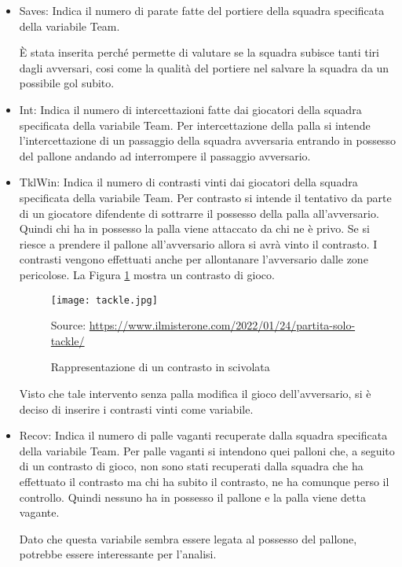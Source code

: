 \begin{itemize}
	
	\item \textsf{Saves}: Indica il numero di parate fatte del portiere della squadra specificata della variabile \textsf{Team}. 
	
	È stata inserita perché permette di valutare se la squadra subisce tanti tiri dagli avversari, cosi come la qualità del portiere nel salvare la squadra da un possibile gol subito.
	
	\item \textsf{Int}: Indica il numero di intercettazioni fatte dai giocatori della squadra specificata della variabile \textsf{Team}. Per intercettazione della palla si intende l'intercettazione di un passaggio della squadra avversaria entrando in possesso del pallone andando ad interrompere il passaggio avversario. 

	\item \textsf{TklWin}: Indica il numero di contrasti vinti dai giocatori della squadra specificata della variabile \textsf{Team}. Per contrasto si intende il tentativo da parte di un giocatore difendente di sottrarre il possesso della palla all'avversario. Quindi chi ha in possesso la palla viene attaccato da chi ne è privo. Se si riesce a prendere il pallone all'avversario allora si avrà vinto il contrasto. I contrasti vengono effettuati anche per allontanare l'avversario dalle zone pericolose. La Figura \ref{fig:tackle} mostra un contrasto di gioco.
	
	\begin{figure}[!ht]
		\begin{center}
			\texttt{[image: tackle.jpg]}
			\caption{Rappresentazione di un contrasto in scivolata}
			Source: \url{https://www.ilmisterone.com/2022/01/24/partita-solo-tackle/}
		 \label{fig:tackle}
		\end{center}
	\end{figure}
	
	Visto che tale intervento senza palla modifica il gioco dell'avversario, si è deciso di inserire i contrasti vinti come variabile. 
	
	\item \textsf{Recov}: Indica il numero di palle vaganti recuperate dalla squadra specificata della variabile \textsf{Team}. Per palle vaganti si intendono quei palloni che, a seguito di un contrasto di gioco, non sono stati recuperati dalla squadra che ha effettuato il contrasto ma chi ha subito il contrasto, ne ha comunque perso il controllo. Quindi nessuno ha in possesso il pallone e la palla viene detta vagante.
	
	Dato che questa variabile sembra essere legata al possesso del pallone, potrebbe essere interessante per l'analisi.
	
	
\end{itemize}


